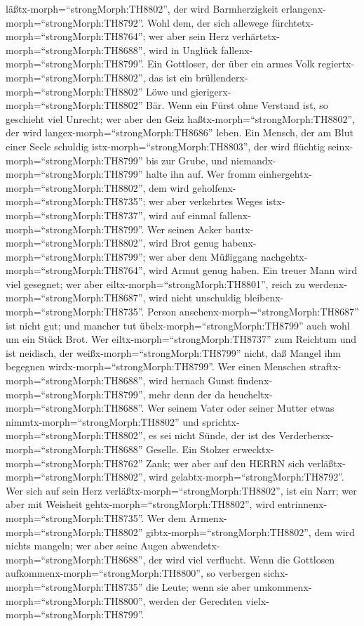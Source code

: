 läßtx-morph=``strongMorph:TH8802'', der wird Barmherzigkeit
erlangenx-morph=``strongMorph:TH8792''.  Wohl dem, der sich
allewege fürchtetx-morph=``strongMorph:TH8764''; wer aber sein Herz
verhärtetx-morph=``strongMorph:TH8688'', wird in Unglück
fallenx-morph=``strongMorph:TH8799''.  Ein Gottloser, der
über ein armes Volk regiertx-morph=``strongMorph:TH8802'', das ist ein
brüllenderx-morph=``strongMorph:TH8802'' Löwe und
gierigerx-morph=``strongMorph:TH8802'' Bär.  Wenn ein Fürst
ohne Verstand ist, so geschieht viel Unrecht; wer aber den Geiz
haßtx-morph=``strongMorph:TH8802'', der wird
langex-morph=``strongMorph:TH8686'' leben.  Ein Mensch, der
am Blut einer Seele schuldig istx-morph=``strongMorph:TH8803'', der wird
flüchtig seinx-morph=``strongMorph:TH8799'' bis zur Grube, und
niemandx-morph=``strongMorph:TH8799'' halte ihn auf.  Wer
fromm einhergehtx-morph=``strongMorph:TH8802'', dem wird
geholfenx-morph=``strongMorph:TH8735''; wer aber verkehrtes Weges
istx-morph=``strongMorph:TH8737'', wird auf einmal
fallenx-morph=``strongMorph:TH8799''.  Wer seinen Acker
bautx-morph=``strongMorph:TH8802'', wird Brot genug
habenx-morph=``strongMorph:TH8799''; wer aber dem Müßiggang
nachgehtx-morph=``strongMorph:TH8764'', wird Armut genug haben.
 Ein treuer Mann wird viel gesegnet; wer aber
eiltx-morph=``strongMorph:TH8801'', reich zu
werdenx-morph=``strongMorph:TH8687'', wird nicht unschuldig
bleibenx-morph=``strongMorph:TH8735''.  Person
ansehenx-morph=``strongMorph:TH8687'' ist nicht gut; und mancher tut
übelx-morph=``strongMorph:TH8799'' auch wohl um ein Stück Brot.
 Wer eiltx-morph=``strongMorph:TH8737'' zum Reichtum und
ist neidisch, der weißx-morph=``strongMorph:TH8799'' nicht, daß Mangel
ihm begegnen wirdx-morph=``strongMorph:TH8799''.  Wer einen
Menschen straftx-morph=``strongMorph:TH8688'', wird hernach Gunst
findenx-morph=``strongMorph:TH8799'', mehr denn der da
heucheltx-morph=``strongMorph:TH8688''.  Wer seinem Vater
oder seiner Mutter etwas nimmtx-morph=``strongMorph:TH8802'' und
sprichtx-morph=``strongMorph:TH8802'', es sei nicht Sünde, der ist des
Verderbersx-morph=``strongMorph:TH8688'' Geselle.  Ein
Stolzer erwecktx-morph=``strongMorph:TH8762'' Zank; wer aber auf den
HERRN sich verläßtx-morph=``strongMorph:TH8802'', wird
gelabtx-morph=``strongMorph:TH8792''.  Wer sich auf sein
Herz verläßtx-morph=``strongMorph:TH8802'', ist ein Narr; wer aber mit
Weisheit gehtx-morph=``strongMorph:TH8802'', wird
entrinnenx-morph=``strongMorph:TH8735''.  Wer dem
Armenx-morph=``strongMorph:TH8802'' gibtx-morph=``strongMorph:TH8802'',
dem wird nichts mangeln; wer aber seine Augen
abwendetx-morph=``strongMorph:TH8688'', der wird viel verflucht.
 Wenn die Gottlosen
aufkommenx-morph=``strongMorph:TH8800'', so verbergen
sichx-morph=``strongMorph:TH8735'' die Leute; wenn sie aber
umkommenx-morph=``strongMorph:TH8800'', werden der Gerechten
vielx-morph=``strongMorph:TH8799''.

